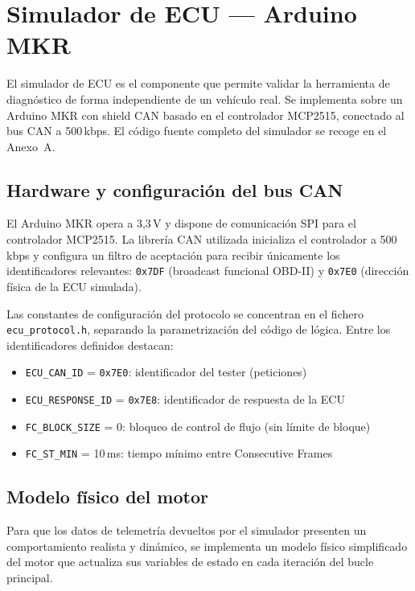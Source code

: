 \section{Simulador de ECU — Arduino MKR}
\label{sec:arduino}

El simulador de ECU es el componente que permite validar la herramienta de diagnóstico de forma independiente de un vehículo real. Se implementa sobre un Arduino MKR con shield CAN basado en el controlador MCP2515, conectado al bus CAN a 500\,kbps. El código fuente completo del simulador se recoge en el Anexo~A.


\subsection{Hardware y configuración del bus CAN}

El Arduino MKR opera a 3,3\,V y dispone de comunicación SPI para el controlador MCP2515. La librería CAN utilizada inicializa el controlador a 500\,kbps y configura un filtro de aceptación para recibir únicamente los identificadores relevantes: \texttt{0x7DF} (broadcast funcional OBD-II) y \texttt{0x7E0} (dirección física de la ECU simulada).

Las constantes de configuración del protocolo se concentran en el fichero \texttt{ecu\_protocol.h}, separando la parametrización del código de lógica. Entre los identificadores definidos destacan:

\begin{itemize}
    \item \texttt{ECU\_CAN\_ID} = \texttt{0x7E0}: identificador del tester (peticiones)
    \item \texttt{ECU\_RESPONSE\_ID} = \texttt{0x7E8}: identificador de respuesta de la ECU
    \item \texttt{FC\_BLOCK\_SIZE} = 0: bloqueo de control de flujo (sin límite de bloque)
    \item \texttt{FC\_ST\_MIN} = 10\,ms: tiempo mínimo entre Consecutive Frames
\end{itemize}


\subsection{Modelo físico del motor}

Para que los datos de telemetría devueltos por el simulador presenten un comportamiento realista y dinámico, se implementa un modelo físico simplificado del motor que actualiza sus variables de estado en cada iteración del bucle principal.


